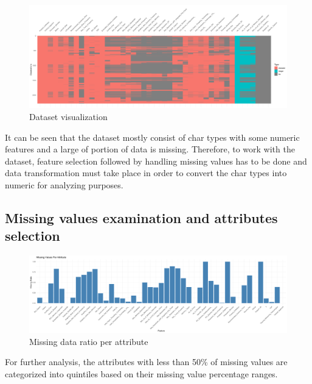 \begin{figure}[H]
    \centering
    \includegraphics[width=16cm]{graphics/visdat.png}
    \caption*{Dataset visualization}
 \end{figure}

It can be seen that the dataset mostly consist of char types with some numeric features and a large of portion of data is missing. Therefore, to work with the dataset, feature selection followed by handling missing values has to be done and data transformation must take place in order to convert the char types into numeric for analyzing purposes.\\

\newpage
\subsection{Missing values examination and attributes selection}

\begin{figure}[h]
    \centering
    \includegraphics[width=16cm]{graphics/missingval.png}
    \caption*{Missing data ratio per attribute}
 \end{figure}

For further analysis, the attributes with less than 50\% of missing values are categorized into quintiles based on their missing value percentage ranges.


